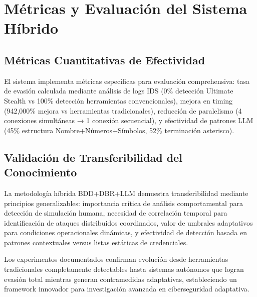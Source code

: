 \section{Métricas y Evaluación del Sistema Híbrido}

\subsection{Métricas Cuantitativas de Efectividad}

El sistema implementa métricas específicas para evaluación comprehensiva: tasa de evasión calculada mediante análisis de logs IDS (0\% detección Ultimate Stealth vs 100\% detección herramientas convencionales), mejora en timing (942,000\% mejora vs herramientas tradicionales), reducción de paralelismo (4 conexiones simultáneas → 1 conexión secuencial), y efectividad de patrones LLM (45\% estructura Nombre+Números+Símbolos, 52\% terminación asterisco).

\subsection{Validación de Transferibilidad del Conocimiento}

La metodología híbrida BDD+DBR+LLM demuestra transferibilidad mediante principios generalizables: importancia crítica de análisis comportamental para detección de simulación humana, necesidad de correlación temporal para identificación de ataques distribuidos coordinados, valor de umbrales adaptativos para condiciones operacionales dinámicas, y efectividad de detección basada en patrones contextuales versus listas estáticas de credenciales.

Los experimentos documentados confirman evolución desde herramientas tradicionales completamente detectables hasta sistemas autónomos que logran evasión total mientras generan contramedidas adaptativas, estableciendo un framework innovador para investigación avanzada en ciberseguridad adaptativa.